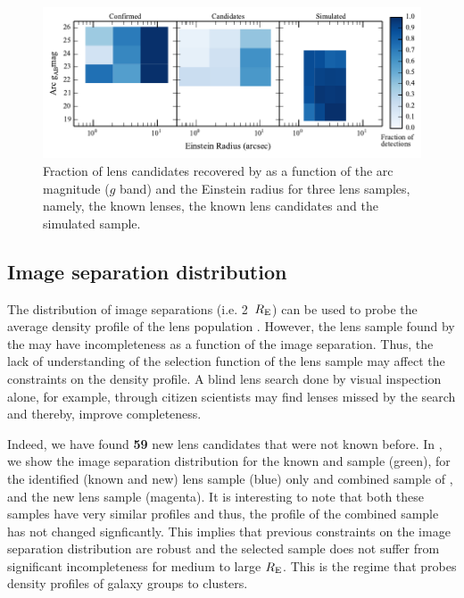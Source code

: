 \documentclass[useAMS,usenatbib,a4paper]{mn2e}
\begin{document}
\begin{figure}
\begin{center}
\includegraphics[scale=1.0]{comp_reinst_mag.pdf}
\caption{ \label{fig:compre} Fraction of lens candidates recovered by \sw as a
function of the arc magnitude ($g$ band) and the Einstein radius for three lens
samples, namely, the known lenses, the known lens candidates and the simulated
sample. }
\end{center}
\end{figure}


\subsection{Image separation distribution}
\label{sec:results:isd}

The distribution of image separations (i.e. 2~$R_{\rm E}$)
can be used to probe the average density profile of the lens population
\citep{Oguri2006,More2012}.  However, the lens sample found by the \af
may have incompleteness as a function of the image separation. Thus, the
lack of understanding of the selection function of the lens sample may
affect the constraints on the density profile. A blind lens search done
by visual inspection alone, for example, through \sw citizen scientists may find
lenses missed by the \af search and thereby, improve completeness.

Indeed, we have found {\bf 59} new lens candidates that were not known
before. In , we show the image separation distribution for
the known \rf and \af sample (green), for the \sw identified (known and
new) lens sample (blue) only and combined \cfhtls sample of \rf, \af and
the new \sw lens sample (magenta). It is interesting to note that both
these samples have very similar profiles and thus, the profile of the
combined sample has not changed signficantly. This implies that previous
constraints on the image separation distribution are robust and the \af
selected sample does not suffer from significant incompleteness for
medium to large $R_{\rm E}$. This is the regime that probes density
profiles of galaxy groups to clusters.
\end{document}

